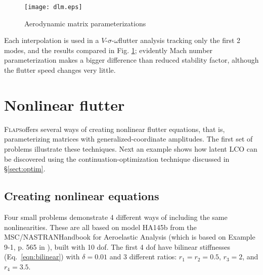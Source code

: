 \documentclass[11pt,openany,twoside]{book}
\numberwithin{equation}{section}		%
\newcommand{\Flaps}{\textsc{Flaps\:}}
\newcommand{\Nastran}{{\footnotesize{NASTRAN\:}}}
\newcommand{\VSO}{$V$-$\sigma$-$\omega$\:}
\newcommand{\Sectref}[1]{\S\ref{#1}}
\newcommand{\Eqn}[1]{Eq.\ \ref{#1}}  %
\newcommand{\Figref}[1]{Fig. \ref{#1}}  %
\begin{document}
\begin{figure}[ht]
		\texttt{[image: dlm.eps]}
 	\centering
 	\caption{Aerodynamic matrix parameterizations}\label{fig:dlm}
 \end{figure}

Each interpolation is used in a \VSO flutter analysis
tracking only the first 2 modes, and the
results compared in \Figref{fig:dlm};
evidently Mach number parameterization
makes a bigger difference than reduced stability factor, although
the flutter speed changes very little.

\newpage
\section{Nonlinear flutter}\label{ex:nl1234}
\Flaps offers several ways of creating nonlinear flutter equations,
that is, parameterizing matrices with generalized-coordinate amplitudes.
The first set of problems illustrate these techniques. Next an example
shows how latent LCO can be discovered using the continuation-optimization
technique discussed in \Sectref{sect:optim}.

\subsection{Creating nonlinear equations}
Four small problems demonstrate 4 different ways of including the
same nonlinearities.
These are all based on model HA145b from the MSC/\Nastran Handbook
for Aeroelastic Analysis \cite{rodden2009msc} (which is based on
Example 9-1, p. 565 in \cite{bisplinghoff1955aeroelasticity}),
built with 10 dof.
The first 4 dof have bilinear stiffnesses (\Eqn{eqn:bilinear})
with $\delta = 0.01$ and 3 different ratios: $r_1 = r_2 = 0.5$,
$r_3 = 2$, and $r_4 = 3.5$.
\end{document}
